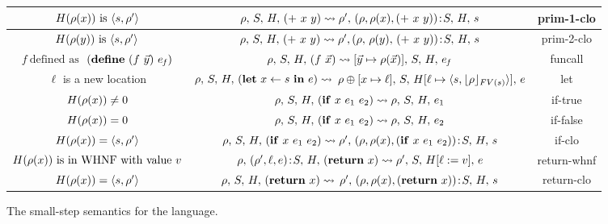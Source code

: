 \documentclass[preprint, 9pt]{sigplanconf}
\newcommand{\comment}[1]{{\color{Myblue}{#1}}}
\def\myvec{\mathaccent"017E }
\begin{document}
\begin{figure*}[t!]
\begin{center}
\begin{tabular}{|c|c|c|}
$H(\rho(x)) \mbox{ is } \langle s, \rho'\rangle$ & $\rho,\, S,\, H,\, (+~x~y)
\rightsquigarrow
\rho',\, (\rho, \rho(x), (+~x~y))\!:\!S,\, H,\, s$      &
{\sc prim-1-clo} \\
\hline
$H(\rho(y)) \mbox{ is } \langle s, \rho'\rangle $ & $\rho,\, S,\, H,\, (+~x~y)
\rightsquigarrow
\rho', (\rho,\, \rho(y),\, (+~x~y))\!:\!S,\, H,\, s$      &
{\sc prim-2-clo} \\
\hline
{$\mathit{f}~\mbox{defined as}$
$~(\DEFINE~(f~\myvec{y})~e_{\mathit{f}})$}  & $\rho,\, S,\, \heap,\,
(f~\myvec{x})  \rightsquigarrow
[\myvec{y} \mapsto \rho(\myvec{x})],\, S,\, \heap,\, e_{\mathit{f}}$      &
{\sc funcall} \\
\hline
$\ell$ is a new location& {$\rho,\, S,\, H,\, (\mbox{$\mathbf{ let}$}~x\leftarrow s~\mbox{$\mathbf{ in}$}~e)
  \rightsquigarrow$
$\rho\oplus[x \mapsto \ell],\, S,\, \heap[\ell \mapsto \langle s,
    \lfloor\rho\rfloor_{FV(s)} %
    \rangle],\, e$} &
{\sc let} \\
\hline
$H(\rho(x)) \ne 0$ & $\rho,\, S,\, H,\, (\mbox{$\mathbf{ if}$}~x~e_1~e_2)   \rightsquigarrow
\rho,\, S,\, H,\,  e_1$ & {\sc if-true} \\
\hline
$H(\rho(x)) = 0$ & $\rho,\, S,\, H,\, (\mbox{$\mathbf{ if}$}~x~e_1~e_2)   \rightsquigarrow
\rho,\, S, \,H, \, e_2$ & {\sc if-false} \\
\hline
$H(\rho(x)) = \langle s, \rho' \rangle $ & {$\rho,\, S,\, H,\,
  (\mbox{$\mathbf{ if}$}~x~e_1~e_2)   \rightsquigarrow
\rho',\, (\rho, \rho(x), (\mbox{$\mathbf{ if}$}~x~e_1~e_2))\!:\!S,\, H, \, s$}
&
{\sc if-clo} \\
\hline
{$H(\rho(x))~\mbox{is in WHNF with value}~v$}& $\rho,\, (\rho', \ell,
e)\!:\!S,\, H,\,
(\mbox{$\mathbf{ return}$}~x)  \rightsquigarrow \rho',\, S,\, H[\ell := v],\, e$ &
{\sc return-whnf}\\
\hline
$H(\rho(x)) = \langle s, \rho' \rangle $ & {$\rho,\, S,\, H,\, (\mbox{$\mathbf{ return}$}~x)
  \rightsquigarrow$
$\rho',\, (\rho, \rho(x), (\mbox{$\mathbf{ return}$}~x))\!:\!S,\, H,\,  s$} &
{\sc return-clo} \\
\hline
\end{tabular}
\caption{The small-step semantics for the language. \label{fig:lang-semantics}}
\end{center}
\vspace*{-6pt}
\end{figure*}
\end{document}
